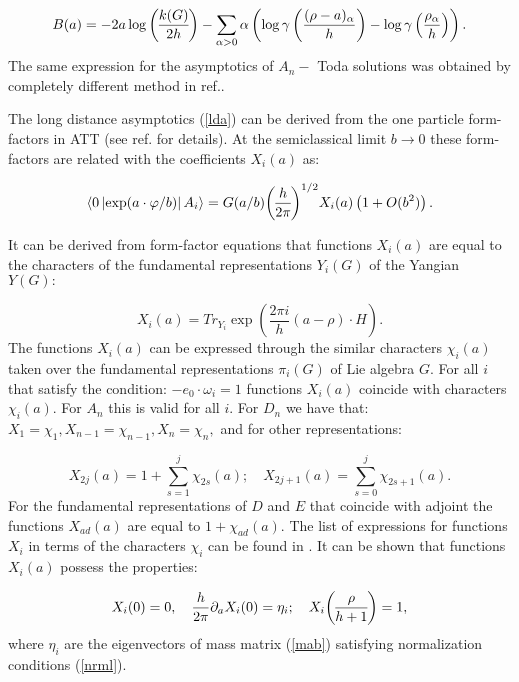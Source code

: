 \documentclass[a4paper,12pt]{article}
\begin{document}
\begin{equation}
B(a)=-2a\log {k(G) \overwithdelims() 2h}
-\sum_{\alpha >0}\alpha \left( \log \gamma \left( \frac{(\rho -a)_\alpha }h
\right) -\log \gamma \left( \frac{\rho _\alpha }h\right) \right).  \label{baf}
\end{equation}
The same expression for the asymptotics of $A_n-$ Toda solutions was
obtained by completely different method in ref.\cite{TW}.

The long distance asymptotics (\ref{lda}) can be derived from the one
particle form-factors in ATT (see ref.\cite{SL} for details). At the
semiclassical limit $b\rightarrow 0$ these form-factors are related with the
coefficients $X_i(a)$ as:

\begin{equation}
\left\langle 0\left| \exp (a\cdot \varphi /b)\right| A_i\right\rangle =G(a/b)
{h \overwithdelims() 2\pi }
^{1/2}X_i(a)\left( 1+O(b^2)\right).  \label{ff}
\end{equation}

It can be derived from form-factor equations that functions $X_i(a)$ are
equal to the characters of the fundamental representations $Y_i(G)$ of the
Yangian $Y(G):$

\begin{equation}
X_i(a)=Tr_{Y_i}\exp \left( \frac{2\pi i}h(a-\rho )\cdot H\right).  \label{xi}
\end{equation}
The functions $X_i(a)$ can be expressed through the similar characters $\chi
_i(a)$ taken over the fundamental representations $\pi _i(G)$ of Lie algebra 
$G.$ For all $i$ that satisfy the condition: $-e_0\cdot \omega _i=1$
functions $X_i(a)$ coincide with characters $\chi _i(a)$. For $A_n$ this is
valid for all $i.$ For $D_n$ we have that: $X_1=\chi _1,X_{n-1}=\chi
_{n-1},X_n=\chi _n,$ and for other representations:

\begin{equation}
X_{2j}(a)=1+\sum_{s=1}^j\chi _{2s}(a);\quad X_{2j+1}(a)=\sum_{s=0}^j\chi
_{2s+1}(a).  \label{dn}
\end{equation}
For the fundamental representations of $D$ and $E$ that coincide with
adjoint the functions $X_{ad}(a)$ are equal to $1+\chi _{ad}(a).$ The list
of expressions for functions $X_i$ in terms of the characters $\chi _i$ can
be found in \cite{K}. It can be shown that functions 
$X_i(a)$ possess the properties:

\begin{equation}
X_i(0)=0,\quad \frac h{2\pi }\partial _aX_i(0)=\eta _i;\quad X_i
{\rho  \overwithdelims() h+1}=1,  \label{pro}
\end{equation}
where $\eta _i$ are the eigenvectors of mass matrix (\ref{mab}) satisfying
normalization conditions (\ref{nrml}).
\end{document}
